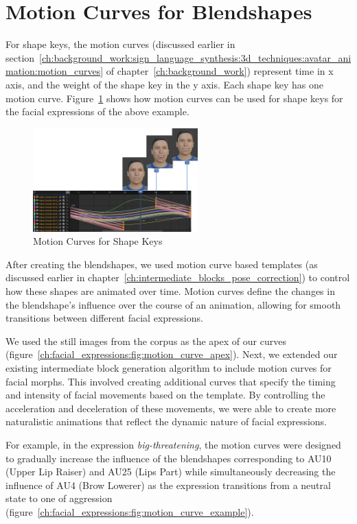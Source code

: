 \documentclass[../../main]{subfiles}
\begin{document}
\section{Motion Curves for Blendshapes}
\label{ch:facial_expressions:motion_curves_for_blendshapes}

For shape keys, the motion curves (discussed earlier in section~\ref{ch:background_work:sign_language_synthesis:3d_techniques:avatar_animation:motion_curves} of chapter~\ref{ch:background_work}) represent time in x axis, and the weight of the shape key in the y axis. Each shape key has one motion curve. Figure~\ref{fig:motion_curves_shape_keys} shows how motion curves can be used for shape keys for the facial expressions of the above example.

\begin{figure}[h]
    \centering \includegraphics[width = 2.5in]{chapters/intermediate_blocks_pose_correction/images/motion_curves_shape_keys.png}
    \caption{Motion Curves for Shape Keys}
    \label{fig:motion_curves_shape_keys}
\end{figure}

After creating the blendshapes, we used motion curve based templates (as discussed earlier in chapter~\ref{ch:intermediate_blocks_pose_correction}) to control how these shapes are animated over time. Motion curves define the changes in the blendshape's influence over the course of an animation, allowing for smooth transitions between different facial expressions.

We used the still images from the corpus as the apex of our curves (figure~\ref{ch:facial_expressions:fig:motion_curve_apex}). Next, we extended our existing intermediate block generation algorithm to include motion curves for facial morphs. This involved creating additional curves that specify the timing and intensity of facial movements based on the template. By controlling the acceleration and deceleration of these movements, we were able to create more naturalistic animations that reflect the dynamic nature of facial expressions.

For example, in the expression \emph{big-threatening}, the motion curves were designed to gradually increase the influence of the blendshapes corresponding to AU10 (Upper Lip Raiser) and AU25 (Lips Part) while simultaneously decreasing the influence of AU4 (Brow Lowerer) as the expression transitions from a neutral state to one of aggression (figure~\ref{ch:facial_expressions:fig:motion_curve_example}).
\end{document}
